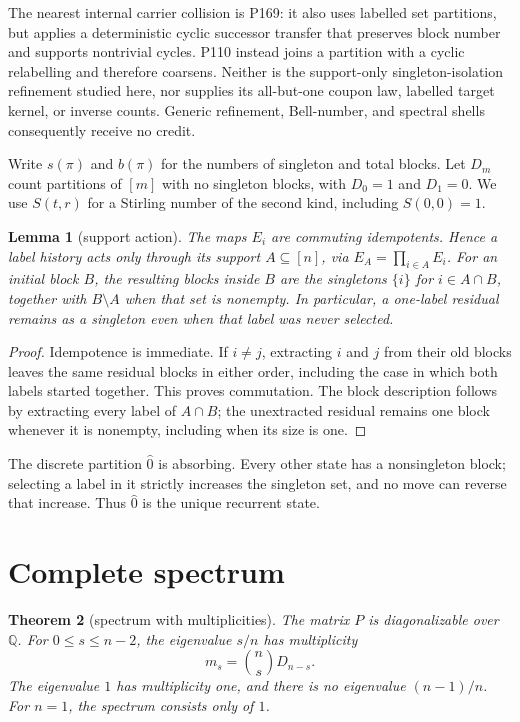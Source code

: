 \documentclass[a4paper,10pt]{amsart}
\newtheorem{theorem}{Theorem}[section]
\newtheorem{lemma}[theorem]{Lemma}
\theoremstyle{remark}
\begin{document}
The nearest internal carrier collision is P169: it also uses labelled set
partitions, but applies a deterministic cyclic successor transfer that
preserves block number and supports nontrivial cycles.  P110 instead joins a
partition with a cyclic relabelling and therefore coarsens.  Neither is the
support-only singleton-isolation refinement studied here, nor supplies its
all-but-one coupon law, labelled target kernel, or inverse counts.  Generic
refinement, Bell-number, and spectral shells consequently receive no credit.

Write $s(\pi)$ and $b(\pi)$ for the numbers of singleton and total blocks.
Let $D_m$ count partitions of $[m]$ with no singleton blocks, with
$D_0=1$ and $D_1=0$.  We use $S(t,r)$ for a Stirling number of the second
kind, including $S(0,0)=1$.

\begin{lemma}[support action]\label{lem:support}
The maps $E_i$ are commuting idempotents.  Hence a label history acts only
through its support $A\subseteq[n]$, via $E_A=\prod_{i\in A}E_i$.
For an initial block $B$, the resulting blocks inside $B$ are the singletons
$\{i\}$ for $i\in A\cap B$, together with $B\setminus A$ when that set is
nonempty.  In particular, a one-label residual remains as a singleton even
when that label was never selected.
\end{lemma}

\begin{proof}
Idempotence is immediate.  If $i\ne j$, extracting $i$ and $j$ from their
old blocks leaves the same residual blocks in either order, including the
case in which both labels started together.  This proves commutation.  The
block description follows by extracting every label of $A\cap B$; the
unextracted residual remains one block whenever it is nonempty, including
when its size is one.
\end{proof}

The discrete partition $\widehat 0$ is absorbing.  Every other state has a
nonsingleton block; selecting a label in it strictly increases the singleton
set, and no move can reverse that increase.  Thus $\widehat0$ is the unique
recurrent state.

\section{Complete spectrum}

\begin{theorem}[spectrum with multiplicities]\label{thm:spectrum}
The matrix $P$ is diagonalizable over $\mathbb Q$.  For
$0\le s\le n-2$, the eigenvalue $s/n$ has multiplicity
\begin{equation}\label{eq:mult}
 m_s=\binom ns D_{n-s}.
\end{equation}
The eigenvalue $1$ has multiplicity one, and there is no eigenvalue
$(n-1)/n$.  For $n=1$, the spectrum consists only of $1$.
\end{theorem}
\end{document}
